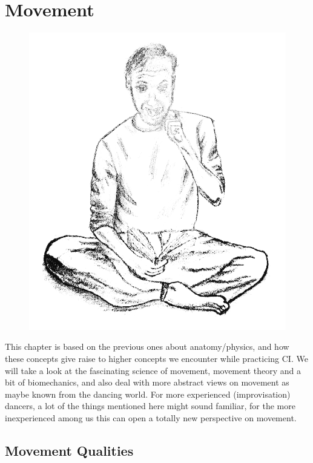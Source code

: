 \chapter{Movement}\label{ch:movement}

\begin{figure}[h]
    \begin{center}
    {\includegraphics[width=0.3\paperwidth]{images/testpic}}
    \end{center}\label{img:movement}
\end{figure}

This chapter is based on the previous ones about anatomy/physics, and how these concepts give raise to higher concepts we encounter while practicing CI\@.
We will take a look at the fascinating science of movement, movement theory and a bit of biomechanics, and also deal with more abstract views on movement as maybe known from the dancing world.
For more experienced (improvisation) dancers, a lot of the things mentioned here might sound familiar, for the more inexperienced among us this can open a totally new perspective on movement.

\section{Movement Qualities}\label{sec:movement-qualities}

